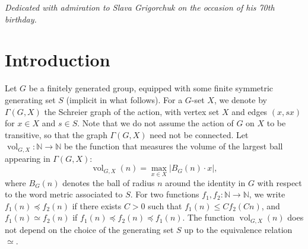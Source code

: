 \documentclass[11pt]{amsart}
\newcommand{\N}{\ensuremath{\mathbb{N}}}%
\newcommand{\vol}{\ensuremath{\operatorname{vol}}}%
\theoremstyle{definition}
\theoremstyle{plain}
\theoremstyle{remark}
\begin{document}
\begin{flushright}
\begin{minipage}[t]{0.85\linewidth}\itshape\small
Dedicated with admiration to Slava Grigorchuk on the occasion of his 70th birthday.
\end{minipage}
\end{flushright}




\section{Introduction}



Let $G$ be a finitely generated group, equipped with some  finite symmetric generating set $S$ (implicit in what follows). For a $G$-set $X$, we denote by $\Gamma(G, X)$ the Schreier graph of the action, with vertex set $X$  and edges $(x, sx)$ for $x\in X$ and $s\in S$. Note that we do not assume the action of $G$ on $X$ to be transitive, so that the graph $\Gamma(G, X)$ need not be connected. Let $\vol_{G, X}\colon \N \to \N$ be the function that measures the volume of the largest ball appearing in $\Gamma(G, X)$:
\[\vol_{G, X}(n)=\max_{x\in X} |B_G(n) \cdot x|,\]
where $B_G(n)$ denotes the ball of radius $n$ around the identity in $G$ with respect to the word metric associated to $S$. 
For two functions $f_1, f_2\colon \N \to \N$, we write $f_1(n)\preccurlyeq f_2(n)$ if there exists $C>0$ such that $f_1(n)\le Cf_2(Cn)$, and $f_1(n)\simeq f_2(n)$ if $f_1(n)\preccurlyeq f_2(n) \preccurlyeq  f_1(n)$. The function $\vol_{G, X}(n)$ does not depend on the choice of  the generating set $S$ up to the equivalence relation $\simeq$. 
\end{document}
